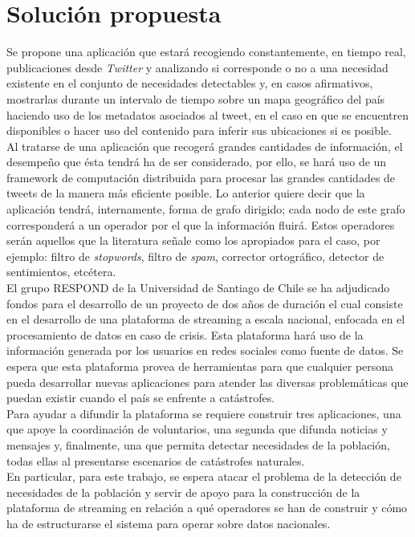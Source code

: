 \section{Soluci\'on propuesta}
\label{intro:solucion}
Se propone una aplicación que estará recogiendo constantemente, en tiempo real, publicaciones desde \textit{Twitter} y analizando si corresponde o no a una necesidad existente en el conjunto de necesidades detectables y, en casos afirmativos, mostrarlas durante un intervalo de tiempo sobre un mapa geográfico del país haciendo uso de los metadatos asociados al tweet, en el caso en que se encuentren disponibles o hacer uso del contenido para inferir sus ubicaciones si es posible.\\
Al tratarse de una aplicación que recogerá grandes cantidades de información, el desempeño que ésta tendrá ha de ser considerado, por ello, se hará uso de un framework de computación distribuida para procesar las grandes cantidades de tweets de la manera más eficiente posible. Lo anterior quiere decir que la aplicación tendrá, internamente, forma de grafo dirigido; cada nodo de este grafo corresponderá a un operador por el que la información fluirá. Estos operadores serán aquellos que la literatura señale como los apropiados para el caso, por ejemplo: filtro de \textit{stopwords}, filtro de \textit{spam}, corrector ortográfico, detector de sentimientos, etcétera.\\
El grupo RESPOND de la Universidad de Santiago de Chile se ha adjudicado fondos para el desarrollo de un proyecto de dos años de duración el cual consiste en el desarrollo de una plataforma de streaming a escala nacional, enfocada en el procesamiento de datos en caso de crisis. Esta plataforma hará uso de la información generada por los usuarios en redes sociales como fuente de datos. Se espera que esta plataforma provea de herramientas para que cualquier persona pueda desarrollar nuevas aplicaciones para atender las diversas problemáticas que puedan existir cuando el país se enfrente a catástrofes.\\
Para ayudar a difundir la plataforma se requiere construir tres aplicaciones, una que apoye la coordinación de voluntarios, una segunda que difunda noticias y mensajes y, finalmente, una que permita detectar necesidades de la población, todas ellas al presentarse escenarios de catástrofes naturales.\\
En particular, para este trabajo, se espera atacar el problema de la detección de necesidades de la población y servir de apoyo para la construcción de la plataforma de streaming en relación a qué operadores se han de construir y cómo ha de estructurarse el sistema para operar sobre datos nacionales.


